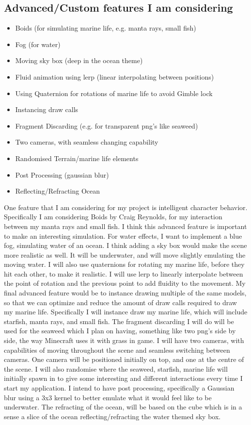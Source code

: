 \documentclass[a4paper, 10pt]{article}
\begin{document}
\subsection{Advanced/Custom features I am considering}
\begin{itemize}
    \item Boids (for simulating marine life, e.g. manta rays, small fish)
    \item Fog (for water)
    \item Moving sky box (deep in the ocean theme)
    \item Fluid animation using lerp (linear interpolating between positions)
    \item Using Quaternion for rotations of marine life to avoid Gimble lock
    \item Instancing draw calls
    \item Fragment Discarding (e.g. for transparent png's like seaweed)
    \item Two cameras, with seamless changing capability
    \item Randomised Terrain/marine life elements
    \item Post Processing (gaussian blur) 
    \item Reflecting/Refracting Ocean 
\end{itemize}

One feature that I am considering for my project is intelligent character behavior. Specifically I am considering Boids \cite{boids} by Craig Reynolds, for my interaction 
between my manta rays and small fish. I think this advanced feature is important to make an interesting simulation. For water effects, I want to implement a blue fog, simulating water of an ocean. 
I think adding a sky box would make the scene more realistic as well. It will be underwater, and will move slightly emulating the moving water.  I will also use quaternions for rotating my marine life,
before they hit each other, to make it realistic. I will use lerp to linearly interpolate between the point of rotation and the previous point to add fluidity to the movement. My final advanced feature would
be to instance drawing multiple of the same models, so that we can optimize and reduce the amount of draw calls required to draw my marine life. Specifically I will instance draw my marine life, which will include
starfish, manta rays, and small fish. The fragment discarding I will do will be used for the seaweed which I plan on having, something like two png's side by side, the way Minecraft uses it with grass in game. I will
have two cameras, with capabilities of moving throughout the scene and seamless switching between cameras. One camera will be positioned initially on top, and one at the centre of the scene. I will also randomise
where the seaweed, starfish, marine life will initially spawn in to give some interesting and different interactions every time I start my application. I intend to have post processing, specifically a Gaussian blur using
a 3x3 kernel to better emulate what it would feel like to be underwater. The refracting of the ocean, will be based on the cube which is in a sense a slice of the ocean reflecting/refracting the water themed sky box.
\end{document}
